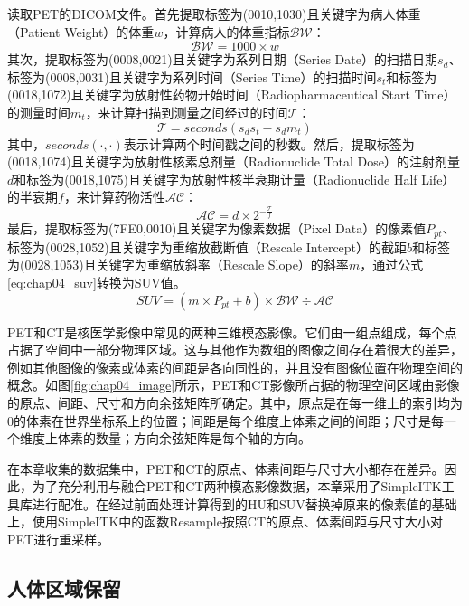 读取PET的DICOM文件。首先提取标签为(0010,1030)且关键字为病人体重（Patient Weight）的体重\(w\)，计算病人的体重指标\(\mathcal{BW}\)：
\begin{equation}
  \mathcal{BW} = 1000 \times w
\end{equation}
其次，提取标签为(0008,0021)且关键字为系列日期（Series Date）的扫描日期\(s_d\)、标签为(0008,0031)且关键字为系列时间（Series Time）的扫描时间\(s_t\)和标签为(0018,1072)且关键字为放射性药物开始时间（Radiopharmaceutical Start Time）的测量时间\(m_t\)，来计算扫描到测量之间经过的时间\(\mathcal{T}\)：
\begin{equation}
  \mathcal{T} = seconds(s_ds_t - s_dm_t)
\end{equation}
其中，\(seconds(\cdot, \cdot)\)表示计算两个时间戳之间的秒数。然后，提取标签为(0018,1074)且关键字为放射性核素总剂量（Radionuclide Total Dose）的注射剂量\(d\)和标签为(0018,1075)且关键字为放射性核半衰期计量（Radionuclide Half Life）的半衰期\(f\)，来计算药物活性\(\mathcal{AC}\)：
\begin{equation}
  \mathcal{AC} = d \times 2^{-\frac{\mathcal{T}}{f}}
\end{equation}
最后，提取标签为(7FE0,0010)且关键字为像素数据（Pixel Data）的像素值\(P_{pt}\)、标签为(0028,1052)且关键字为重缩放截断值（Rescale Intercept）的截距\(b\)和标签为(0028,1053)且关键字为重缩放斜率（Rescale Slope）的斜率\(m\)，通过公式\ref{eq:chap04_suv}转换为SUV值。
\begin{equation}
  SUV = (m \times P_{pt} + b) \times \mathcal{BW} \div \mathcal{AC}
  \label{eq:chap04_suv}
\end{equation}

PET和CT是核医学影像中常见的两种三维模态影像。它们由一组点组成，每个点占据了空间中一部分物理区域。这与其他作为数组的图像之间存在着很大的差异，例如其他图像的像素或体素的间距是各向同性的，并且没有图像位置在物理空间的概念。如图\ref{fig:chap04_image}所示，PET和CT影像所占据的物理空间区域由影像的原点、间距、尺寸和方向余弦矩阵所确定。其中，原点是在每一维上的索引均为0的体素在世界坐标系上的位置；间距是每个维度上体素之间的间距；尺寸是每一个维度上体素的数量；方向余弦矩阵是每个轴的方向。

在本章收集的数据集中，PET和CT的原点、体素间距与尺寸大小都存在差异。因此，为了充分利用与融合PET和CT两种模态影像数据，本章采用了SimpleITK工具库\cite{yaniv2018simpleitk}进行配准。在经过前面处理计算得到的HU和SUV替换掉原来的像素值的基础上，使用SimpleITK中的函数Resample按照CT的原点、体素间距与尺寸大小对PET进行重采样。

\subsection{人体区域保留}

